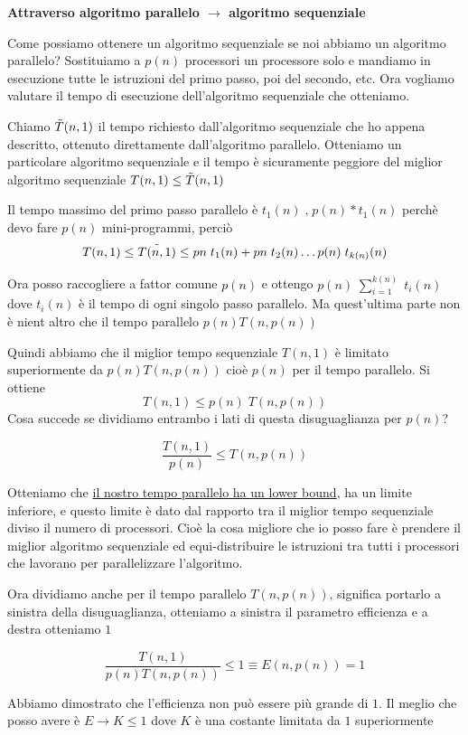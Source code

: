 \begin{dimostrazione}
\textbf{Attraverso algoritmo parallelo $\rightarrow$ algoritmo sequenziale}

Come possiamo ottenere un algoritmo sequenziale se noi abbiamo un algoritmo parallelo? Sostituiamo a $p(n)$ processori un processore solo e mandiamo in esecuzione tutte le istruzioni del primo passo, poi del secondo, etc. Ora vogliamo valutare il tempo di esecuzione dell'algoritmo sequenziale che otteniamo. 

Chiamo $\Tilde{T}(n,1)$ il tempo richiesto dall'algoritmo sequenziale che ho appena descritto, ottenuto direttamente dall'algoritmo parallelo.
Otteniamo un particolare algoritmo sequenziale e il tempo è sicuramente peggiore del miglior algoritmo sequenziale $T(n,1) \leq \Tilde{T}(n,1)$

Il tempo massimo del primo passo parallelo è $t_1(n)\;\text{,}\;p(n) * t_1(n)$ perchè devo fare $p(n)$ mini-programmi, perciò
$$T(n,1) \leq \Tilde{T(n,1)} \leq pn\;t_1(n) + pn\;t_2(n) \dots p(n)\;t_{k(n)}(n)$$

Ora posso raccogliere a fattor comune $p(n)$ e ottengo $p(n)\;\sum_{i=1}^{k(n)}\;t_i(n)$ dove $t_i(n)$ è il tempo di ogni singolo passo parallelo. Ma quest'ultima parte non è nient altro che il tempo parallelo $p(n)T(n,p(n))$

Quindi abbiamo che il miglior tempo sequenziale $T(n,1)$ è limitato superiormente da $p(n)T(n,p(n))$ cioè $p(n)$ per il tempo parallelo. Si ottiene 
$$T(n,1) \leq p(n)\;T(n,p(n))$$
Cosa succede se dividiamo entrambo i lati di questa disuguaglianza per $p(n)$?

$$\frac{T(n,1)}{p(n)} \leq T(n,p(n))$$

Otteniamo che \uline{il nostro tempo parallelo ha un lower bound}, ha un limite inferiore, e questo limite è dato dal rapporto tra il miglior tempo sequenziale diviso il numero di processori. Cioè la cosa migliore che io posso fare è prendere il miglior algoritmo sequenziale ed equi-distribuire le istruzioni tra tutti i processori che lavorano per parallelizzare l'algoritmo.

Ora dividiamo anche per il tempo parallelo $T(n,p(n))$, significa portarlo a sinistra della disuguaglianza, otteniamo a sinistra il parametro efficienza e a destra otteniamo $1$

$$\frac{T(n,1)}{p(n)T(n,p(n))} \leq 1 \equiv E(n,p(n)) = 1$$

Abbiamo dimostrato che l'efficienza non può essere più grande di $1$.
Il meglio che posso avere è $E \rightarrow K \leq 1$ dove $K$ è una costante limitata da $1$ superiormente
\end{dimostrazione}

